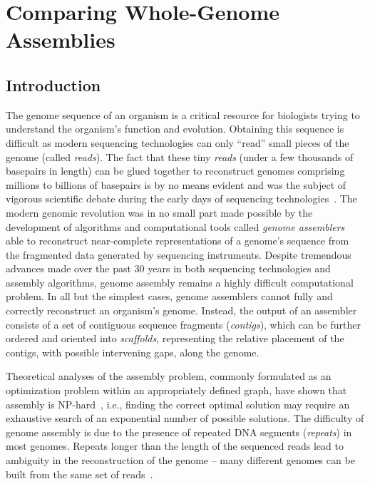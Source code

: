 \chapter{Comparing Whole-Genome Assemblies}

\section{Introduction}
The genome sequence of an organism is a critical resource for
biologists trying to understand the organism's function and
evolution.  Obtaining this sequence is difficult as modern sequencing
technologies can only ``read'' small pieces of the genome (called
\emph{reads}).  The fact that these tiny \emph{reads} (under a few
thousands of basepairs in length) can be glued together to reconstruct genomes
comprising millions to billions of basepairs is by no means evident
and was the subject of vigorous scientific debate during the early
days of sequencing technologies~\cite{green1997against,weber1997human}. The modern genomic revolution was in no small part made
possible by the development of algorithms and computational tools called
\emph{genome assemblers} able to reconstruct near-complete
representations of a genome's sequence from the fragmented data
generated by sequencing instruments.  Despite tremendous advances made
over the past 30 years in both sequencing technologies and assembly
algorithms, genome assembly remains a highly difficult computational
problem.  In all but the simplest cases, genome assemblers cannot
fully and correctly reconstruct an organism's genome.  Instead, the
output of an assembler consists of a set of contiguous sequence
fragments (\emph{contigs}), which can be further ordered and oriented
into \emph{scaffolds}, representing the relative placement of the
contigs, with possible intervening gaps, along the genome.


Theoretical analyses of the assembly problem, commonly formulated as
an optimization problem within an appropriately defined graph, have
shown that assembly is
NP-hard~\cite{myers1995,medvedev2007computability}, i.e., finding the
correct optimal solution may require an exhaustive search of an
exponential number of possible solutions.  The difficulty of genome
assembly is due to the presence of repeated DNA
segments (\emph{repeats}) in most genomes. Repeats longer than the length of the sequenced reads lead to ambiguity in the reconstruction of the genome
-- many different genomes can be built from the same set of
reads~\cite{nagarajan2009complexity,kingsford2010assembly}.

